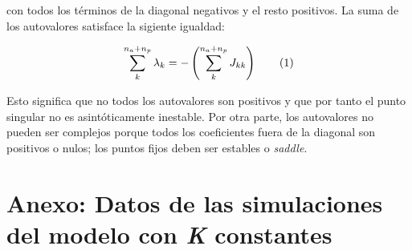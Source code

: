 \noindent con todos los términos de la diagonal negativos y el resto positivos. La suma de los autovalores satisface la sigiente igualdad:

\begin{equation}
  \sum_{k}^{n_{a}+n_{p}} \lambda_{k}= -\left(\sum_{k}^{n_{a}+n_{p}} J_{kk}\right)
  \stepcounter{equation}\tag{\theequation}\label{eq:sum_lambdas}
\end{equation}

Esto significa que no todos los autovalores son positivos y que por tanto el punto singular no es asintóticamente inestable. Por otra parte, los autovalores no pueden ser complejos porque todos los coeficientes fuera de la diagonal son positivos o nulos; los puntos fijos deben ser estables o  \textit{saddle}.

\clearpage
\section{Anexo: Datos de las simulaciones del modelo con \textit{K} constantes}
\label{DINAMICA_ANEXO_KConst}

